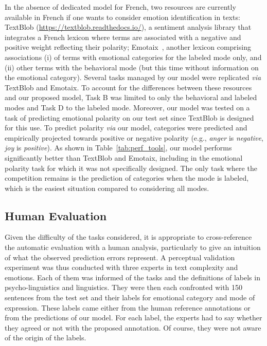 In the absence of dedicated model for French, two resources are currently available in French if one wants to consider emotion identification in texts: TextBlob ({\small\url{https://textblob.readthedocs.io/}}), a sentiment analysis library that integrates a French lexicon where terms are associated with a negative and positive weight reflecting their polarity; Emotaix~\cite{piolat2009example}, another lexicon comprising associations (i) of terms with emotional categories for the labeled mode only, and (ii) other terms with the behavioral mode (but this time without information on the emotional category).
%
Several tasks managed by our model were replicated \textit{via} TextBlob and Emotaix. To account for the differences between these resources and our proposed model, Task B was limited to only the behavioral and labeled modes and Task D to the labeled mode.
%
Moreover, our model was tested on a task of predicting emotional polarity on our test set since TextBlob is designed for this use. To predict polarity \textit{via} our model, categories were predicted and empirically projected towards positive or negative polarity (e.g., \textit{anger} is \textit{negative}, \textit{joy} is \textit{positive}).
%
As shown in Table~\ref{tab:perf_tools}, our model performs significantly better than TextBlob and Emotaix, including in the emotional polarity task for which it was not specifically designed. The only task where the competition remains is the prediction of categories when the mode is labeled, which is the easiest situation compared to considering all modes.







\subsection{Human Evaluation}
\label{sec:human_eval}
%
Given the difficulty of the tasks considered, it is appropriate to cross-reference the automatic evaluation with a human analysis, particularly to give an intuition of what the observed prediction errors represent.
%
A perceptual validation experiment was thus conducted with three experts in text complexity and emotions. Each of them was informed of the tasks and the definitions of labels in psycho-linguistics and linguistics. They were then each confronted with 150 sentences from the test set and their labels for emotional category and mode of expression. These labels came either from the human reference annotations or from the predictions of our model. For each label, the experts had to say whether they agreed or not with the proposed annotation. Of course, they were not aware of the origin of the labels.


